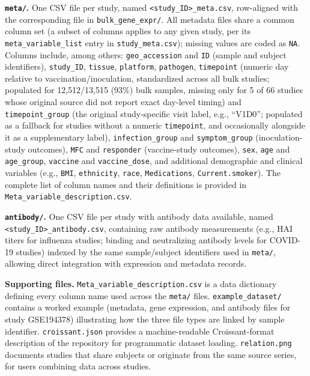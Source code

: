 \documentclass[
  12pt]{article}
\begin{document}
\noindent\textbf{\texttt{meta/}.} One CSV file per study, named \texttt{<study\_ID>\_meta.csv}, row-aligned with the corresponding file in \texttt{bulk\_gene\_expr/}. All metadata files share a common column set (a subset of columns applies to any given study, per its \texttt{meta\_variable\_list} entry in \texttt{study\_meta.csv}); missing values are coded as \texttt{NA}. Columns include, among others: \texttt{geo\_accession} and \texttt{ID} (sample and subject identifiers), \texttt{study\_ID}, \texttt{tissue}, \texttt{platform}, \texttt{pathogen}, \texttt{timepoint} (numeric day relative to vaccination/inoculation, standardized across all bulk studies; populated for 12{,}512/13{,}515 (93\%) bulk samples, missing only for 5 of 66 studies whose original source did not report exact day-level timing) and \texttt{timepoint\_group} (the original study-specific visit label, e.g., ``V1D0''; populated as a fallback for studies without a numeric \texttt{timepoint}, and occasionally alongside it as a supplementary label), \texttt{infection\_group} and \texttt{symptom\_group} (inoculation-study outcomes), \texttt{MFC} and \texttt{responder} (vaccine-study outcomes), \texttt{sex}, \texttt{age} and \texttt{age\_group}, \texttt{vaccine} and \texttt{vaccine\_dose}, and additional demographic and clinical variables (e.g., \texttt{BMI}, \texttt{ethnicity}, \texttt{race}, \texttt{Medications}, \texttt{Current.smoker}). The complete list of column names and their definitions is provided in \texttt{Meta\_variable\_description.csv}.

\noindent\textbf{\texttt{antibody/}.} One CSV file per study with antibody data available, named \texttt{<study\_ID>\_antibody.csv}, containing raw antibody measurements (e.g., HAI titers for influenza studies; binding and neutralizing antibody levels for COVID-19 studies) indexed by the same sample/subject identifiers used in \texttt{meta/}, allowing direct integration with expression and metadata records.

\noindent\textbf{Supporting files.} \texttt{Meta\_variable\_description.csv} is a data dictionary defining every column name used across the \texttt{meta/} files. \texttt{example\_dataset/} contains a worked example (metadata, gene expression, and antibody files for study GSE194378) illustrating how the three file types are linked by sample identifier. \texttt{croissant.json} provides a machine-readable Croissant-format description of the repository for programmatic dataset loading. \texttt{relation.png} documents studies that share subjects or originate from the same source series, for users combining data across studies.
\end{document}
